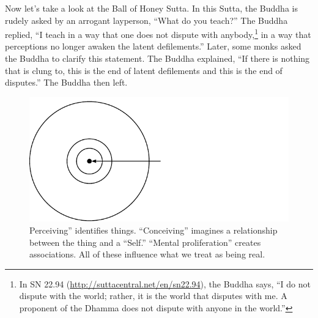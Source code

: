 Now let’s take a look at the Ball of Honey Sutta. In this Sutta, the Buddha is rudely asked by an arrogant layperson, “What do you teach?” The Buddha replied, “I teach in a way that one does not dispute with anybody,\footnote{In SN 22.94 (\url{http://suttacentral.net/en/sn22.94}), the Buddha says, “I do not dispute with the world; rather, it is the world that disputes with me. A proponent of the Dhamma does not dispute with anyone in the world.”} in a way that perceptions no longer awaken the latent defilements.” Later, some monks asked the Buddha to clarify this statement. The Buddha explained, “If there is nothing that is clung to, this is the end of latent defilements and this is the end of disputes.” The Buddha then left. 

\begin{figure}[h]
\centering
\includegraphics[width=0.55\linewidth]{./Diagrams/Reality}
\caption{Perceiving” identifies things. “Conceiving” imagines a relationship between the thing and a “Self.” “Mental proliferation” creates associations. All of these influence what we treat as being real.}
\label{fig:Reality}
\end{figure}

